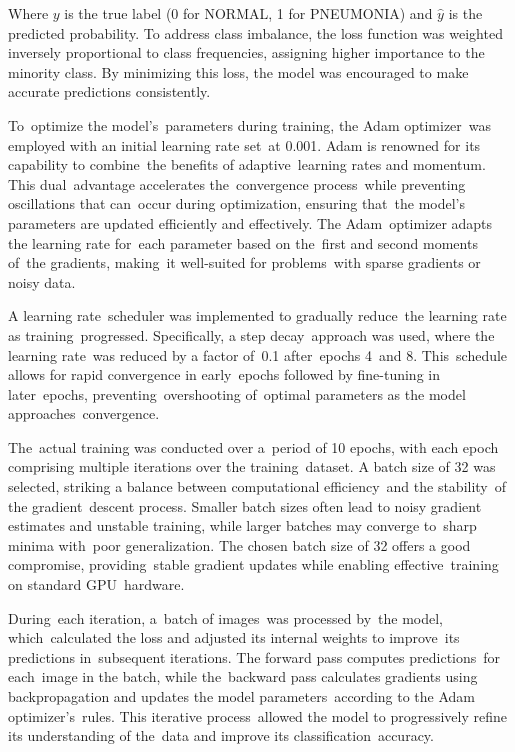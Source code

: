 \documentclass[
  twocolumn,
  10pt,
  a4paper,
  journal
]{IEEEtran}
\begin{document}
Where $y$ is the true label (0 for NORMAL, 1 for PNEUMONIA) and $\hat{y}$ is the predicted probability. To address class imbalance, the loss function was weighted inversely proportional to class frequencies, assigning higher importance to the minority class. By minimizing this loss, the model was encouraged to make accurate predictions consistently.

To~optimize the model's~parameters during training, the
Adam optimizer~was employed with an initial learning rate set~at 0.001.
Adam is renowned for its capability to combine~the benefits of
adaptive~learning rates and momentum. This dual~advantage accelerates
the~convergence process~while preventing oscillations that can~occur
during optimization, ensuring that~the model's
parameters are updated efficiently and effectively. The Adam~optimizer
adapts the learning rate for~each parameter based on the~first and
second moments of~the gradients, making~it well-suited for problems~with
sparse gradients or noisy data.

A learning rate~scheduler was implemented to gradually reduce~the
learning rate as training~progressed. Specifically, a step
decay~approach was used, where the learning rate~was reduced by a factor
of~0.1 after~epochs 4~and 8. This~schedule allows for rapid convergence
in early~epochs followed by fine-tuning in later~epochs,
preventing~overshooting of~optimal parameters as the model
approaches~convergence.

The~actual training was conducted over a~period of 10 epochs, with each
epoch comprising multiple iterations over the training~dataset. A batch
size of 32 was selected, striking a balance between computational
efficiency~and the stability~of the gradient~descent process. Smaller
batch sizes often lead to noisy gradient estimates and unstable
training, while larger batches may converge to~sharp minima with~poor
generalization. The chosen batch size of 32 offers a good compromise,
providing~stable gradient updates while enabling effective~training on
standard GPU~hardware.

During~each iteration, a~batch of images~was processed by~the model,
which~calculated the loss and adjusted its internal weights to
improve~its predictions in~subsequent iterations. The forward pass
computes predictions~for each~image in the batch, while the~backward
pass calculates gradients using backpropagation and updates the model
parameters~according to the Adam optimizer's~rules. This
iterative process~allowed the model to progressively refine its
understanding of the~data and improve its classification~accuracy.
\end{document}
